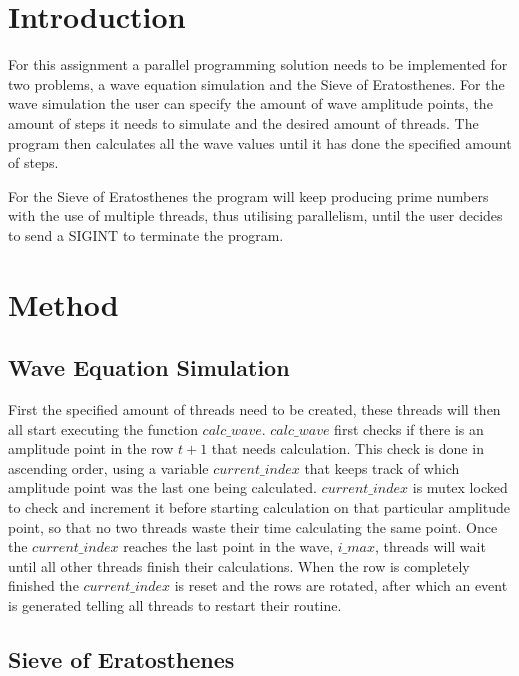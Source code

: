 \documentclass[a4paper,12px]{article}
\begin{document}
\tableofcontents
\clearpage


\section{Introduction}

For this assignment a parallel programming solution needs to be implemented for
two problems, a wave equation simulation and the Sieve of Eratosthenes. For the
wave simulation the user can specify the amount of wave amplitude points, the
amount of steps it needs to simulate and the desired amount of threads. The
program then calculates all the wave values until it has done the specified
amount of steps.

For the Sieve of Eratosthenes the program will keep producing prime numbers with
the use of multiple threads, thus utilising parallelism, until the user decides
to send a SIGINT to terminate the program.

\section{Method}
\subsection{Wave Equation Simulation}

First the specified amount of threads need to be created, these threads will
then all start executing the function $calc\_wave$. $calc\_wave$ first checks if
there is an amplitude point in the row $t+1$ that needs calculation. This check
is done in ascending order, using a variable $current\_index$ that keeps track
of which amplitude point was the last one being calculated. $current\_index$ is
mutex locked to check and increment it before starting calculation on that
particular amplitude point, so that no two threads waste their time calculating
the same point. Once the $current\_index$ reaches the last point in the wave,
$i\_max$, threads will wait until all other threads finish their calculations.
When the row is completely finished the $current\_index$ is reset and the rows
are rotated, after which an event is generated telling all threads to restart
their routine.

\subsection{Sieve of Eratosthenes}
\end{document}

